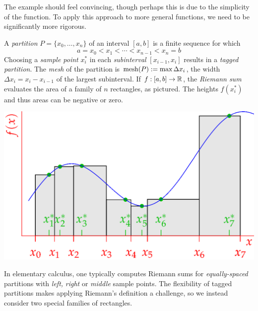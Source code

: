 The example should feel convincing, though perhaps this is due to the simplicity of the function. To apply this approach to more general functions, we need to be significantly more rigorous.



\goodbreak


\begin{defn}{}{}
	A \emph{partition} $P=\{x_0,\ldots,x_n\}$ of an interval $[a,b]$ is a finite sequence for which
	\[
		a=x_0<x_1<\cdots< x_{n-1}< x_n=b
	\]
	Choosing a \emph{sample point} $x_i^*$ in each \emph{subinterval} $[x_{i-1},x_i]$ results in a \emph{tagged partition}.\smallbreak
	The \emph{mesh} of the partition is $\operatorname{mesh}(P):=\max\Delta x_i$, the width $\Delta x_i=x_i-x_{i-1}$ of the largest subinterval.\smallbreak
	If $f:[a,b]\to\mathbb{R}$, the \emph{Riemann sum}  evaluates the area of a family of $n$ rectangles, as pictured. The heights $f(x_i^*)$ and thus areas can be negative or zero.
	\begin{center}
	\includegraphics[scale=0.95]{riemann-sum}
	\end{center}
\end{defn}

In elementary calculus, one typically computes Riemann sums for \emph{equally-spaced} partitions with \emph{left,} \emph{right} or \emph{middle} sample points. The flexibility of tagged partitions makes applying Riemann's definition a challenge, so we instead consider two special families of rectangles. 


